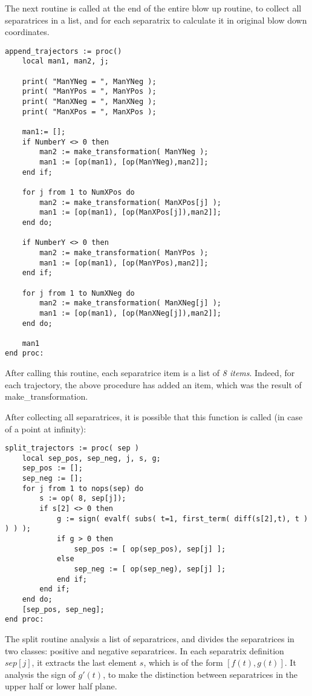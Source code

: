 \documentclass[a4paper,10pt]{article}
\begin{document}
The next routine is called at the end of the entire blow up routine, to collect all separatrices in a list,
and for each separatrix to calculate it in original blow down coordinates.

\begin{lstlisting}[name=blowup]
append_trajectors := proc()
    local man1, man2, j;

    print( "ManYNeg = ", ManYNeg );
    print( "ManYPos = ", ManYPos );
    print( "ManXNeg = ", ManXNeg );
    print( "ManXPos = ", ManXPos );

    man1:= [];
    if NumberY <> 0 then
        man2 := make_transformation( ManYNeg );
        man1 := [op(man1), [op(ManYNeg),man2]];
    end if;

    for j from 1 to NumXPos do
        man2 := make_transformation( ManXPos[j] );
        man1 := [op(man1), [op(ManXPos[j]),man2]];
    end do;

    if NumberY <> 0 then
        man2 := make_transformation( ManYPos );
        man1 := [op(man1), [op(ManYPos),man2]];
    end if;

    for j from 1 to NumXNeg do
        man2 := make_transformation( ManXNeg[j] );
        man1 := [op(man1), [op(ManXNeg[j]),man2]];
    end do;

    man1
end proc:
\end{lstlisting}

After calling this routine, each separatrice item is a list of \emph{8 items}.  Indeed, for
each trajectory, the above procedure has added an item, which was the result of make\_transformation.
\medskip

After collecting all separatrices, it is possible that this function is called (in case of a point at
infinity):

\begin{lstlisting}[name=blowup]
split_trajectors := proc( sep )
    local sep_pos, sep_neg, j, s, g;
    sep_pos := [];
    sep_neg := [];
    for j from 1 to nops(sep) do
        s := op( 8, sep[j]);
        if s[2] <> 0 then
            g := sign( evalf( subs( t=1, first_term( diff(s[2],t), t ) ) ) );
            if g > 0 then
                sep_pos := [ op(sep_pos), sep[j] ];
            else
                sep_neg := [ op(sep_neg), sep[j] ];
            end if;
        end if;
    end do;
    [sep_pos, sep_neg];
end proc:
\end{lstlisting}
The split routine analysis a list of separatrices, and divides the separatrices in two classes:
positive and negative separatrices.  In each separatrix definition $sep[j]$, it extracts
the last element $s$, which is of the form $[f(t),g(t)]$.  It analysis the sign of $g'(t)$, to make
the distinction between separatrices in the upper half or lower half plane.
\medskip
\end{document}
